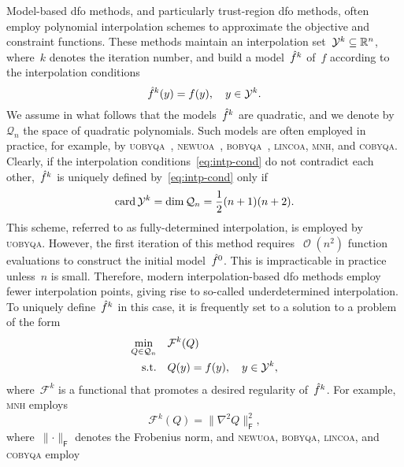 \documentclass{article}
\numberwithin{equation}{section}
\theoremstyle{definition}
\theoremstyle{plain}
\theoremstyle{remark}
\DeclareMathOperator{\bigo}{\mathcal{O}}
\DeclareMathOperator{\card}{card}
\newcommand*{\norm}[2][]{#1\lVert#2#1\rVert}
\newcommand*{\obj}{f}
\newcommand*{\objm}[1][]{\hat{\obj}\ifblank{#1}{}{^{#1}}}
\newcommand*{\qpoly}{\mathcal{Q}_n}
\newcommand*{\R}{\mathbb{R}}
\newcommand*{\solvername}[1]{\textsc{#1}\xspace}
\newcommand*{\xpt}[1][]{\mathcal{Y}\ifblank{#1}{}{^{#1}}}
\begin{document}
Model-based \gls{dfo} methods, and particularly trust-region \gls{dfo} methods, often employ polynomial interpolation schemes to approximate the objective and constraint functions.
These methods maintain an interpolation set~$\xpt[k] \subseteq \R^n$, where~$k$ denotes the iteration number, and build a model~$\objm[k]$ of~$\obj$ according to the interpolation conditions
\begin{equation}
    \label{eq:intp-cond}
    \objm[k](y) = \obj(y), \quad y \in \xpt[k].
\end{equation}
We assume in what follows that the models~$\objm[k]$ are quadratic, and we denote by~$\qpoly$ the space of quadratic polynomials.
Such models are often employed in practice, for example, by \solvername{uobyqa}~\cite{Powell_2002}, \solvername{newuoa}~\cite{Powell_2006}, \solvername{bobyqa}~\cite{Powell_2009}, \solvername{lincoa}, \solvername{mnh}, and \solvername{cobyqa}.
Clearly, if the interpolation conditions~\eqref{eq:intp-cond} do not contradict each other,~$\objm[k]$ is uniquely defined by~\eqref{eq:intp-cond} only if
\begin{equation*}
    \card\xpt[k] = \dim\qpoly = \frac{1}{2} (n + 1) (n + 2).
\end{equation*}
This scheme, referred to as fully-determined interpolation, is employed by \solvername{uobyqa}.
However, the first iteration of this method requires~$\bigo(n^2)$ function evaluations to construct the initial model~$\objm[0]$.
This is impracticable in practice unless~$n$ is small.
Therefore, modern interpolation-based \gls{dfo} methods employ fewer interpolation points, giving rise to so-called underdetermined interpolation.
To uniquely define~$\objm[k]$ in this case, it is frequently set to a solution to a problem of the form
\begin{equation}
    \label{eq:intp-var}
    \begin{aligned}
        \min_{Q \in \qpoly} & \quad \mathcal{F}^k(Q)\\
        \text{s.t.}         & \quad Q(y) = \obj(y), \quad y \in \xpt[k],
    \end{aligned}
\end{equation}
where~$\mathcal{F}^k$ is a functional that promotes a desired regularity of~$\objm[k]$.
For example, \solvername{mnh} employs
\begin{equation}
    \label{eq:mnh}
    \mathcal{F}^k(Q) = \norm[\big]{\nabla^2 Q}_{\mathsf{F}}^2,
\end{equation}
where~$\norm{\cdot}_{\mathsf{F}}$ denotes the Frobenius norm, and \solvername{newuoa}, \solvername{bobyqa}, \solvername{lincoa}, and \solvername{cobyqa} employ
\end{document}
